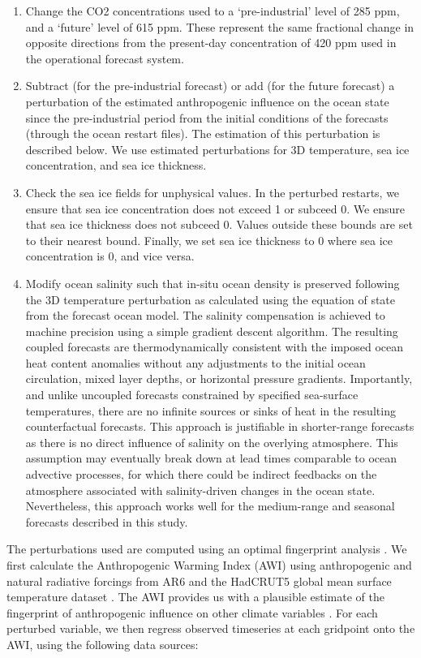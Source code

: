     \begin{enumerate}
      \item Change the CO2 concentrations used to a `pre-industrial' level of 285 ppm, and a `future' level of 615 ppm. These represent the same fractional change in opposite directions from the present-day concentration of 420 ppm used in the operational forecast system.
      \item Subtract (for the pre-industrial forecast) or add (for the future forecast) a perturbation of the estimated anthropogenic influence on the ocean state since the pre-industrial period from the initial conditions of the forecasts (through the ocean restart files). The estimation of this perturbation is described below. We use estimated perturbations for 3D temperature, sea ice concentration, and sea ice thickness.
      \item Check the sea ice fields for unphysical values. In the perturbed restarts, we ensure that sea ice concentration does not exceed 1 or subceed 0. We ensure that sea ice thickness does not subceed 0. Values outside these bounds are set to their nearest bound. Finally, we set sea ice thickness to 0 where sea ice concentration is 0, and vice versa.
      \item Modify ocean salinity such that in-situ ocean density is preserved following the 3D temperature perturbation as calculated using the equation of state from the forecast ocean model. The salinity compensation is achieved to machine precision using a simple gradient descent algorithm. The resulting coupled forecasts are thermodynamically consistent with the imposed ocean heat content anomalies without any adjustments to the initial ocean circulation, mixed layer depths, or horizontal pressure gradients. Importantly, and unlike uncoupled forecasts constrained by specified sea-surface temperatures, there are no infinite sources or sinks of heat in the resulting counterfactual forecasts. This approach is justifiable in shorter-range forecasts as there is no direct influence of salinity on the overlying atmosphere. This assumption may eventually break down at lead times comparable to ocean advective processes, for which there could be indirect feedbacks on the atmosphere associated with salinity-driven changes in the ocean state. Nevertheless, this approach works well for the medium-range and seasonal forecasts described in this study.
    \end{enumerate}
  
    The perturbations used are computed using an optimal fingerprint analysis \cite{hasselmann_optimal_1993,hasselmann_multi-pattern_1997,haustein_real-time_2017}. We first calculate the Anthropogenic Warming Index (AWI) using anthropogenic and natural radiative forcings from AR6 \cite{masson-delmotte_earths_2021} and the HadCRUT5 global mean surface temperature dataset \cite{morice_updated_2021}. The AWI provides us with a plausible estimate of the fingerprint of anthropogenic influence on other climate variables \cite{hasselmann_optimal_1993}. For each perturbed variable, we then regress observed timeseries at each gridpoint onto the AWI, using the following data sources:
  
